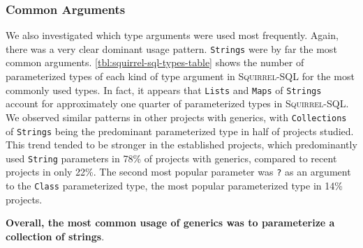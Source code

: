 \documentclass{svjour3}
\newcommand{\code}[1]{\texttt{#1}}
\newcommand{\squirrelsql}{\textsc{Squirrel-SQL}\xspace}
\begin{document}
\subsubsection{Common Arguments}

We also investigated which type arguments were used most frequently.  
Again, there was a very clear dominant usage pattern.  
\code{Strings} were by far the most common arguments. 
\autoref{tbl:squirrel-sql-types-table} shows the
number of parameterized types of each kind of type argument in \squirrelsql for the most
commonly used types.  
In fact, it appears that \code{Lists} and 
\code{Maps} of \code{Strings}
account for approximately one quarter of parameterized types
in \squirrelsql.
We observed similar patterns in other projects with generics, 
with \code{Collections} of \code{Strings} being the predominant parameterized type in
half of projects studied. %
This trend tended to be stronger in the established projects, which predominantly 
used \code{String} parameters in 78\% of projects with generics, %
compared to recent projects in only 22\%. %
The second most popular parameter was \code{?} as an argument to the 
\code{Class} parameterized type, the most popular parameterized type in 14\% projects. %

\textbf{Overall, the most common usage of generics was to parameterize a collection of strings}.



\end{document}
